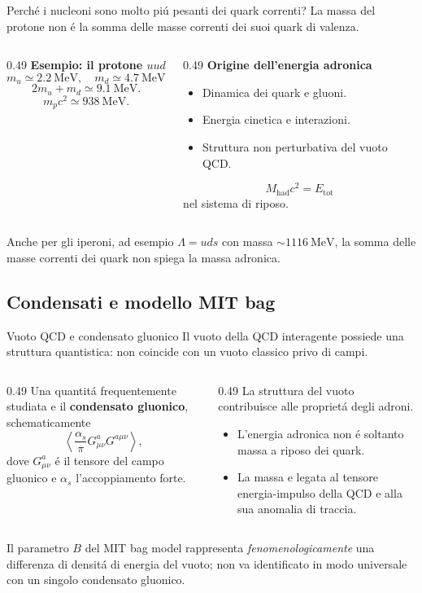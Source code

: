 \begin{frame}{Perch\'e i nucleoni sono molto pi\'u pesanti dei quark correnti?}
\small
La massa del protone non \'e la somma delle masse correnti dei suoi
quark di valenza.
\begin{columns}[T,onlytextwidth]
\begin{column}{0.49\textwidth}
\textbf{Esempio: il protone $uud$}
\[
m_u\simeq2.2\ \mathrm{MeV},\quad
m_d\simeq4.7\ \mathrm{MeV}.
\]
\[
2m_u+m_d\simeq9.1\ \mathrm{MeV}.
\]
\[
m_pc^2\simeq938\ \mathrm{MeV}.
\]
\end{column}
\begin{column}{0.49\textwidth}
\textbf{Origine dell'energia adronica}
\begin{itemize}
\item Dinamica dei quark e gluoni.
\item Energia cinetica e interazioni.
\item Struttura non perturbativa del vuoto QCD.
\end{itemize}
\[
M_{\mathrm{had}}c^2=E_{\mathrm{tot}}
\]
nel sistema di riposo.
\end{column}
\end{columns}
\medskip
Anche per gli iperoni, ad esempio $\Lambda=uds$ con massa
$\sim1116\ \mathrm{MeV}$, la somma delle masse correnti dei
quark non spiega la massa adronica.
\end{frame}

\subsection{Condensati e modello MIT bag}

\begin{frame}{Vuoto QCD e condensato gluonico}
\small
Il vuoto della QCD interagente possiede una struttura quantistica:
non coincide con un vuoto classico privo di campi.
\begin{columns}[T,onlytextwidth]
\begin{column}{0.49\textwidth}
Una quantit\'a frequentemente studiata e il
\textbf{condensato gluonico}, schematicamente
\[
\left\langle\frac{\alpha_s}{\pi}
G^a_{\mu\nu}G^{a\mu\nu}\right\rangle,
\]
dove $G^a_{\mu\nu}$ \'e il tensore del campo
gluonico e $\alpha_s$ l'accoppiamento forte.
\end{column}
\begin{column}{0.49\textwidth}
La struttura del vuoto contribuisce
alle propriet\'a degli adroni.
\begin{itemize}
\item L'energia adronica non \'e soltanto massa
      a riposo dei quark.
\item La massa e legata al tensore energia-impulso
      della QCD e alla sua anomalia di traccia.
\end{itemize}
\end{column}
\end{columns}
\medskip
Il parametro $B$ del MIT bag model rappresenta \emph{fenomenologicamente}
una differenza di densit\'a di energia del vuoto; non va identificato
in modo universale con un singolo condensato gluonico.
\end{frame}

